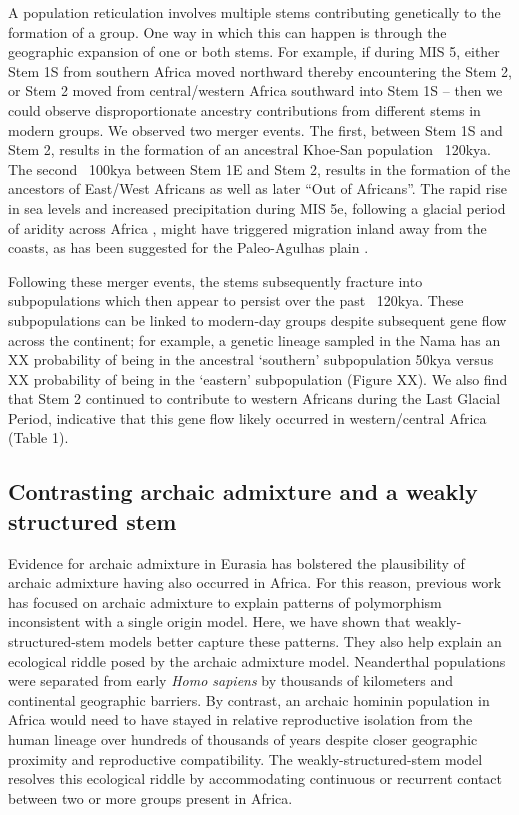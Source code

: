 \documentclass{article}
\begin{document}
A population reticulation involves multiple stems contributing genetically to
the formation of a group. One way in which this can happen is through the
geographic expansion of one or both stems. For example, if during MIS 5, either
Stem 1S from southern Africa moved northward thereby encountering the Stem 2,
or Stem 2 moved from central/western Africa southward into Stem 1S -- then we
could observe disproportionate ancestry contributions from different stems in
modern groups. We observed two merger events. The first, between Stem 1S and
Stem 2, results in the formation of an ancestral Khoe-San population ~120kya.
The second ~100kya between Stem 1E and Stem 2, results in the formation of the
ancestors of East/West Africans as well as later “Out of Africans”. The rapid
rise in sea levels and increased precipitation during MIS 5e, following a
glacial period of aridity across Africa \citep{Blome2012-lw}, might have
triggered migration inland away from the coasts, as has been suggested for the
Paleo-Agulhas plain \citep{Marean2014-pg}. 

Following these merger events, the stems subsequently fracture into
subpopulations which then appear to persist over the past ~120kya. These
subpopulations can be linked to modern-day groups despite subsequent gene flow
across the continent; for example, a genetic lineage sampled in the Nama has an
XX probability of being in the ancestral ‘southern’ subpopulation 50kya versus
XX probability of being in the ‘eastern’ subpopulation (Figure XX). We also
find that Stem 2 continued to contribute to western Africans during the Last
Glacial Period, indicative that this gene flow likely occurred in
western/central Africa (Table 1). 

\subsection*{Contrasting archaic admixture and a weakly structured stem}

Evidence for archaic admixture in Eurasia has bolstered the plausibility of
archaic admixture having also occurred in Africa. For this reason, previous
work has focused on archaic admixture to explain patterns of polymorphism
inconsistent with a single origin model. Here, we have shown that
weakly-structured-stem models better capture these patterns.
They also help explain an
ecological riddle posed by the archaic admixture model. Neanderthal populations
were separated from early \emph{Homo sapiens} by thousands of kilometers and
continental geographic barriers. By contrast, an archaic hominin population in
Africa would need to have stayed in relative reproductive isolation from the
human lineage over hundreds of thousands of years despite closer geographic
proximity and reproductive compatibility. The weakly-structured-stem model
resolves this ecological riddle by accommodating continuous or recurrent
contact between two or more groups present in Africa.
\end{document}
